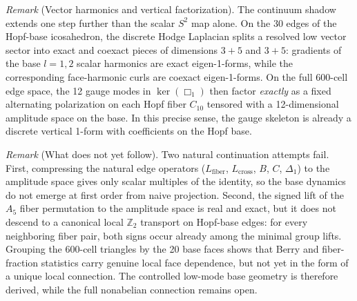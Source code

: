 \documentclass[12pt,a4paper]{article}
\theoremstyle{definition}
\begin{document}
\noindent\textit{Remark} (Vector harmonics and vertical factorization).  The continuum shadow extends one step further than the scalar $S^2$ map alone.  On the 30 edges of the Hopf-base icosahedron, the discrete Hodge Laplacian splits a resolved low vector sector into exact and coexact pieces of dimensions $3+5$ and $3+5$: gradients of the base $l=1,2$ scalar harmonics are exact eigen-1-forms, while the corresponding face-harmonic curls are coexact eigen-1-forms.  On the full 600-cell edge space, the 12 gauge modes in $\ker(\Box_1)$ then factor \emph{exactly} as a fixed alternating polarization on each Hopf fiber $C_{10}$ tensored with a 12-dimensional amplitude space on the base.  In this precise sense, the gauge skeleton is already a discrete vertical 1-form with coefficients on the Hopf base.

\noindent\textit{Remark} (What does not yet follow).  Two natural continuation attempts fail.  First, compressing the natural edge operators ($L_{\mathrm{fiber}}$, $L_{\mathrm{cross}}$, $B$, $C$, $\Delta_1$) to the amplitude space gives only scalar multiples of the identity, so the base dynamics do not emerge at first order from naive projection.  Second, the signed lift of the $A_5$ fiber permutation to the amplitude space is real and exact, but it does not descend to a canonical local $\mathbb{Z}_2$ transport on Hopf-base edges: for every neighboring fiber pair, both signs occur already among the minimal group lifts.  Grouping the 600-cell triangles by the 20 base faces shows that Berry and fiber-fraction statistics carry genuine local face dependence, but not yet in the form of a unique local connection.  The controlled low-mode base geometry is therefore derived, while the full nonabelian connection remains open.
\end{document}
